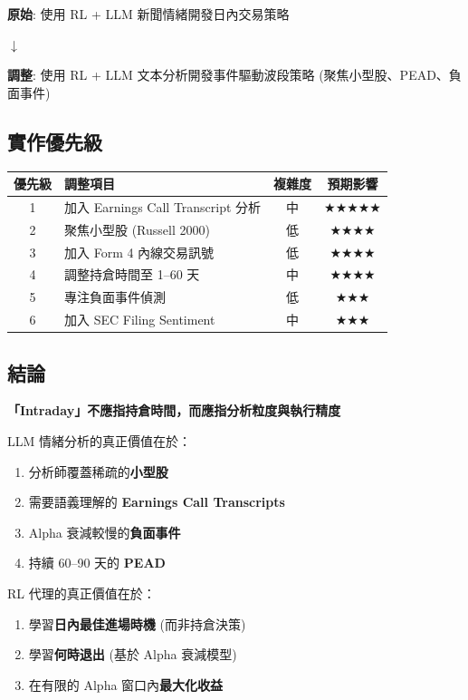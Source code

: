 \documentclass[11pt,a4paper]{article}
\newcommand{\starmark}{\textcolor{warningyellow}{$\bigstar$}}
\begin{document}
\begin{tcolorbox}[colback=successgreen!5,colframe=successgreen,title={\textbf{推薦定位調整}}]
\textbf{原始}: 使用 RL + LLM 新聞情緒開發日內交易策略

$\downarrow$

\textbf{調整}: 使用 RL + LLM 文本分析開發事件驅動波段策略 (聚焦小型股、PEAD、負面事件)
\end{tcolorbox}

\subsection*{實作優先級}

\begin{table}[H]
\centering
\begin{tabular}{@{}clcc@{}}
\toprule
\textbf{優先級} & \textbf{調整項目} & \textbf{複雜度} & \textbf{預期影響} \\
\midrule
1 & 加入 Earnings Call Transcript 分析 & 中 & \starmark\starmark\starmark\starmark\starmark \\
2 & 聚焦小型股 (Russell 2000) & 低 & \starmark\starmark\starmark\starmark \\
3 & 加入 Form 4 內線交易訊號 & 低 & \starmark\starmark\starmark\starmark \\
4 & 調整持倉時間至 1--60 天 & 中 & \starmark\starmark\starmark\starmark \\
5 & 專注負面事件偵測 & 低 & \starmark\starmark\starmark \\
6 & 加入 SEC Filing Sentiment & 中 & \starmark\starmark\starmark \\
\bottomrule
\end{tabular}
\end{table}

\subsection*{結論}

\begin{tcolorbox}[colback=ibkrblue!5,colframe=ibkrblue]
\textbf{「Intraday」不應指持倉時間，而應指分析粒度與執行精度}

LLM 情緒分析的真正價值在於：
\begin{enumerate}
    \item 分析師覆蓋稀疏的\textbf{小型股}
    \item 需要語義理解的 \textbf{Earnings Call Transcripts}
    \item Alpha 衰減較慢的\textbf{負面事件}
    \item 持續 60--90 天的 \textbf{PEAD}
\end{enumerate}

RL 代理的真正價值在於：
\begin{enumerate}
    \item 學習\textbf{日內最佳進場時機} (而非持倉決策)
    \item 學習\textbf{何時退出} (基於 Alpha 衰減模型)
    \item 在有限的 Alpha 窗口內\textbf{最大化收益}
\end{enumerate}
\end{tcolorbox}
\end{document}
